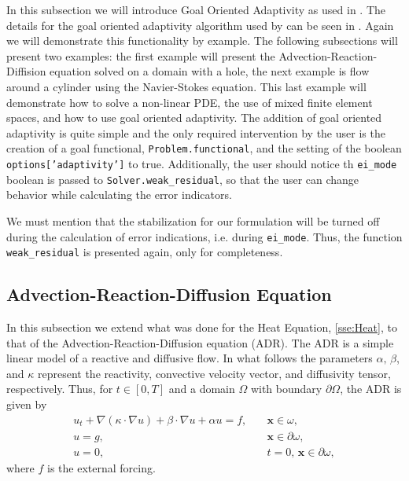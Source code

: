     In this subsection we will introduce Goal Oriented Adaptivity as used in
    \ASP.  The details for the goal oriented adaptivity algorithm used by \ASP
    can be seen in \cite{Foster2014e,Jansson2014a,Jansson2014b}. Again we will
    demonstrate this functionality by example. The following subsections will
    present two examples: the first example will present the
    Advection-Reaction-Diffision equation solved on a domain with a hole, the
    next example is flow around a cylinder using the Navier-Stokes equation.
    This last example will demonstrate how to solve a non-linear PDE, the use of
    mixed finite element spaces, and how to use goal oriented adaptivity.  The
    addition of goal oriented adaptivity is quite simple and the only required
    intervention by the user is the creation of a goal functional,
    \texttt{Problem.functional}, and the setting of the boolean
    \texttt{options['adaptivity']} to true.  Additionally, the user should
    notice th  \texttt{ei\_mode} boolean is passed to
    \texttt{Solver.weak\_residual}, so that the user can change behavior while
    calculating the error indicators.

    \begin{remark}
        We must mention that the stabilization for our formulation will be
        turned off during the calculation of error indications, i.e. during
        \texttt{ei\_mode}. Thus, the function \texttt{weak\_residual} is
        presented again, only for completeness.
    \end{remark}

\subsection{Advection-Reaction-Diffusion Equation} \label{sse:ADR}
    In this subsection we extend what was done for the Heat Equation,
    \autoref{sse:Heat}, to that of the Advection-Reaction-Diffusion equation
    (ADR). The ADR is a simple linear model of a reactive and diffusive flow. In
    what follows the parameters $\alpha,\,\beta$, and $\kappa$ represent the
    reactivity, convective velocity vector, and diffusivity tensor,
    respectively. Thus, for $t\in [0,T]$ and a domain $\Omega$ with boundary
    $\partial \Omega$, the ADR is given by
    \begin{equation}
        \begin{split}
            u_t + \nabla \left(\kappa\cdot \nabla u \right) + \beta \cdot \nabla
                u + \alpha u = f,& \quad \mathbf{x} \in \omega, \\
            u = g,& \quad \mathbf{x} \in \partial \omega, \\
            u = 0,& \quad t = 0,\, \mathbf{x} \in \partial \omega,
        \end{split}
        \label{eq:ADR}
    \end{equation}
    where $f$ is the external forcing.

